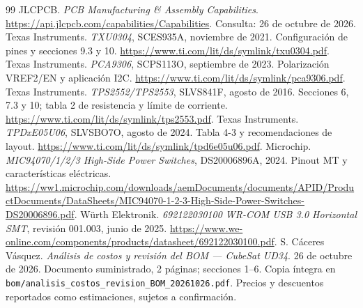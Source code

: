 \documentclass[11pt,letterpaper]{article}
\begin{document}
\begin{thebibliography}{99}
 JLCPCB. \emph{PCB Manufacturing \& Assembly Capabilities}. \url{https://api.jlcpcb.com/capabilities/Capabilities}. Consulta: 26 de octubre de 2026.
 Texas Instruments. \emph{TXU0304}, SCES935A, noviembre de 2021. Configuración de pines y secciones 9.3 y 10. \url{https://www.ti.com/lit/ds/symlink/txu0304.pdf}.
 Texas Instruments. \emph{PCA9306}, SCPS113O, septiembre de 2023. Polarización VREF2/EN y aplicación I2C. \url{https://www.ti.com/lit/ds/symlink/pca9306.pdf}.
 Texas Instruments. \emph{TPS2552/TPS2553}, SLVS841F, agosto de 2016. Secciones 6, 7.3 y 10; tabla 2 de resistencia y límite de corriente. \url{https://www.ti.com/lit/ds/symlink/tps2553.pdf}.
 Texas Instruments. \emph{TPDxE05U06}, SLVSBO7O, agosto de 2024. Tabla 4-3 y recomendaciones de layout. \url{https://www.ti.com/lit/ds/symlink/tpd6e05u06.pdf}.
 Microchip. \emph{MIC94070/1/2/3 High-Side Power Switches}, DS20006896A, 2024. Pinout MT y características eléctricas. \url{https://ww1.microchip.com/downloads/aemDocuments/documents/APID/ProductDocuments/DataSheets/MIC94070-1-2-3-High-Side-Power-Switches-DS20006896.pdf}.
 Würth Elektronik. \emph{692122030100 WR-COM USB 3.0 Horizontal SMT}, revisión 001.003, junio de 2025. \url{https://www.we-online.com/components/products/datasheet/692122030100.pdf}.
 S. Cáceres Vásquez. \emph{Análisis de costos y revisión del BOM --- CubeSat UD34}. 26 de octubre de 2026. Documento suministrado, 2 páginas; secciones 1--6. Copia íntegra en \texttt{bom/analisis\_costos\_revision\_BOM\_20261026.pdf}. Precios y descuentos reportados como estimaciones, sujetos a confirmación.
\end{thebibliography}
\end{document}
